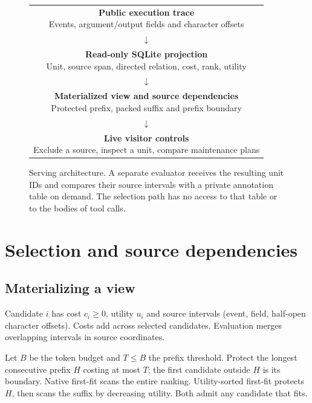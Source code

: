 \documentclass[conference]{IEEEtran}
\begin{document}
\begin{figure}[t]
\centering
\setlength{\fboxsep}{4pt}
\begin{tabular}{@{}c@{}}
\fcolorbox{forest}{white}{\parbox{.88\columnwidth}{\centering \textbf{Public execution trace}\\Events, argument/output fields and character offsets}}\\
$\downarrow$\\
\fcolorbox{forest}{white}{\parbox{.88\columnwidth}{\centering \textbf{Read-only SQLite projection}\\Unit, source span, directed relation, cost, rank, utility}}\\
$\downarrow$\\
\fcolorbox{forest}{white}{\parbox{.88\columnwidth}{\centering \textbf{Materialized view and source dependencies}\\Protected prefix, packed suffix and prefix boundary}}\\
$\downarrow$\\
\fcolorbox{forest}{white}{\parbox{.88\columnwidth}{\centering \textbf{Live visitor controls}\\Exclude a source, inspect a unit, compare maintenance plans}}\\
\end{tabular}
\caption{Serving architecture. A separate evaluator receives the resulting unit IDs and compares their source intervals with a private annotation table on demand. The selection path has no access to that table or to the bodies of tool calls.}
\label{fig:system}
\end{figure}

\section{Selection and source dependencies}

\subsection{Materializing a view}
Candidate $i$ has cost $c_i\geq0$, utility $u_i$ and source intervals (event, field, half-open character offsets). Costs add across selected candidates. Evaluation merges overlapping intervals in source coordinates.

Let $B$ be the token budget and $T\leq B$ the prefix threshold. Protect the longest consecutive prefix $H$ costing at most $T$; the first candidate outside $H$ is its boundary. Native first-fit scans the entire ranking. Utility-sorted first-fit protects $H$, then scans the suffix by decreasing utility. Both admit any candidate that fits.
\end{document}
